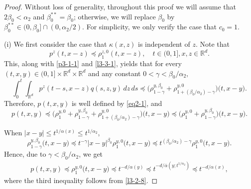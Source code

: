 \documentclass[a4paper,11pt]{amsart}
\renewcommand{\le}{\leqslant}
\newcommand{\R}{\mathds R}
\newcommand{\B}{\beta}
\newcommand{\p}{\preceq}
\newcommand{\K}{\kappa}
\newcommand{\A}{\alpha}
\newcommand{\G}{\gamma}
\theoremstyle{definition}
\begin{document}
\begin{proof} Without loss of generality, throughout this proof we will assume that $2\B_0<\A_2$ and $\B_0^{**}=\B_0$; otherwise, we will replace $\B_0$ by $\B_0^{**}\in (0,\B_0]\cap (0,{\A_2}/{2}).$ For simplicity, we only verify the case that $c_0=1$.

(i) We first consider the case that $\K(x,z)$ is independent of $z$.
Note that $$p^z(t,x-z)\p \rho_1^{z,0}(t,x-z),\quad t\in (0,1],x,z\in \R^d.$$ This, along with
\eqref{p3-1-1} and \eqref{l3-3-1}, yields that for every $(t,x,y)\in
(0,1]\times \R^d \times \R^d$ and {any constant
$0<\G<{\B_0}/{\A_2},$}
\begin{equation*}
\int_0^t \int_{\R^d} p^z(t-s,x-
z)q(s,z,y)\,dz\,ds\p
\big(\rho^{y,\B_0}_{1-\gamma}+
\rho^{y,0}_{1+({\B_0}/{\A_2})-\gamma}\big)\big(t,x-y\big).
\end{equation*}
Therefore, $p(t,x,y)$ is well defined by \eqref{eq2-1}, and
\begin{equation}\label{p3-2-3}
p(t,x,y)\p \Big(\rho^{y,0}_1+\rho^{y,\B_0}_{1-\gamma}+
\rho^{y,0}_{1+({\B_0}/{\A_2})-\gamma}\Big)\big(t,x-y\big)\p
\big(\rho^{y,0}_1+\rho^{y,\B_0}_{1-\gamma}\big)\big(t,x-y\big).
\end{equation}

When $|x-y|\le t^{{1/\A(x)}}\le t^{{1/\A_2}}$,
$$\rho^{y,\B_0}_{1-\gamma}\big(t,x-y\big)\p t^{-\G}|x-y|^{\B_0}\rho^{y,0}_1\big(t,x-y\big)
\p t^{({\B_0}/{\A_2})-\G}\rho^{y,0}_1\big(t,x-y\big).$$
Hence, due to $\G<{\B_0}/{\A_2}$, we get
\begin{equation}\label{p3-2-3a}
\begin{split}
p(t,x,y)\p \rho^{y,0}_1\big(t,x-y\big)\p t^{-{d/\A(y)}}\p
t^{-{d}/{\overline{\A}(y;t^{{1/\A_2}})}}\p t^{-{d/\A(x)}},
\end{split}
\end{equation}
where the third inequality follows from \eqref{l3-2-8}.


\end{proof}
\end{document}

